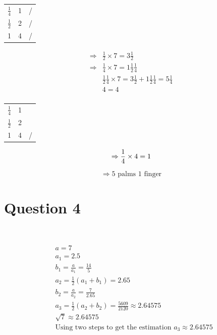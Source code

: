 \documentclass{article}
\begin{document}
\begin{center}
    \begin{tabular}{ccc}
        $\frac{1}{4}$&1&/  \\
        $\frac{1}{2}$&2&/\\
        1&4&/\\
    \end{tabular}
\end{center}

\begin{align*}
    \Rightarrow&\frac{1}{2}\times7=3\frac{1}{2}\\
    \Rightarrow&\frac{1}{4}\times7=1\frac{1}{2}\frac{1}{4}\\
    &\frac{1}{2}\frac{1}{4}\times7=3\frac{1}{2}+1\frac{1}{2}\frac{1}{4}=5\frac{1}{4}\\
    &4=4\\
\end{align*}

\begin{center}
    \begin{tabular}{ccc}
        $\frac{1}{4}$ & 1 &\\
        $\frac{1}{2}$ & 2&\\
        1&4&/\\
    \end{tabular}
\end{center}

\[
\Rightarrow\frac{1}{4}\times4=1\\
\]

\[
\Rightarrow 5\text{ palms }1\text{ finger}
\]

\newpage

\section*{Question 4}

~

\begin{align*}
    &a=7\\
    &a_1=2.5\\
    &b_1=\frac{a}{a_1}=\frac{14}{5}\\
    &a_2=\frac{1}{2}(a_1+b_1)=2.65\\
    &b_2=\frac{a}{a_2}=\frac{7}{2.65}\\
    &a_3=\frac{1}{2}(a_2+b_2)=\frac{5609}{2120}\approx2.64575\\
    &\sqrt{7}\approx2.64575\\
    &\text{Using two steps to get the estimation }a_3\approx2.64575\\
\end{align*}
\end{document}

